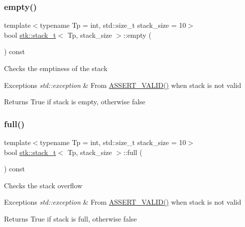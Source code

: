 \subsubsection{\texorpdfstring{empty()}{empty()}}
{\footnotesize\ttfamily template$<$typename Tp  = int, std\+::size\+\_\+t stack\+\_\+size = 10$>$ \\
bool \hyperlink{classstk_1_1stack__t}{stk\+::stack\+\_\+t}$<$ Tp, stack\+\_\+size $>$\+::empty (\begin{DoxyParamCaption}{ }\end{DoxyParamCaption}) const\hspace{0.3cm}{\ttfamily [inline]}}

Checks the emptiness of the stack 
\begin{DoxyExceptions}{Exceptions}
{\em std\+::exception} & From \hyperlink{stack_8h_a4ad7af85cae2910ffcf6bfbcb8278886}{A\+S\+S\+E\+R\+T\+\_\+\+V\+A\+L\+I\+D()} when stack is not valid \\
\hline
\end{DoxyExceptions}
\begin{DoxyReturn}{Returns}
True if stack is empty, otherwise false 
\end{DoxyReturn}
\mbox{\label{classstk_1_1stack__t_a62b9e32ef2b123939b4c21175b5fc036}} 
\subsubsection{\texorpdfstring{full()}{full()}}
{\footnotesize\ttfamily template$<$typename Tp  = int, std\+::size\+\_\+t stack\+\_\+size = 10$>$ \\
bool \hyperlink{classstk_1_1stack__t}{stk\+::stack\+\_\+t}$<$ Tp, stack\+\_\+size $>$\+::full (\begin{DoxyParamCaption}{ }\end{DoxyParamCaption}) const\hspace{0.3cm}{\ttfamily [inline]}}

Checks the stack overflow 
\begin{DoxyExceptions}{Exceptions}
{\em std\+::exception} & From \hyperlink{stack_8h_a4ad7af85cae2910ffcf6bfbcb8278886}{A\+S\+S\+E\+R\+T\+\_\+\+V\+A\+L\+I\+D()} when stack is not valid \\
\hline
\end{DoxyExceptions}
\begin{DoxyReturn}{Returns}
True if stack is full, otherwise false 
\end{DoxyReturn}
\mbox{\label{classstk_1_1stack__t_a6c1813c8dc347f0cc9ab94a6e120d743}} 

